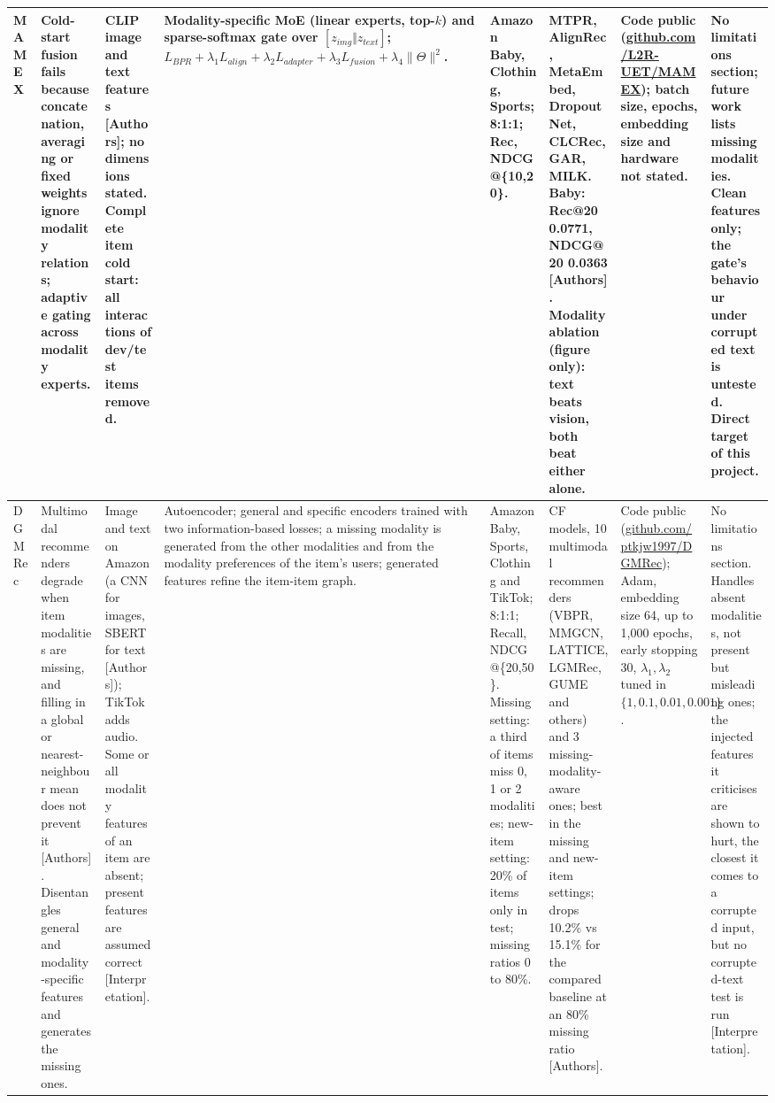 \documentclass[conference]{IEEEtran}
\begin{document}
\begin{longtable}{@{}p{1.7cm}*{7}{>{\raggedright\arraybackslash}p{2.0cm}}@{}}
\midrule
MAMEX~\cite{nguyen2025mamex} & Cold-start fusion fails because concatenation, averaging or fixed weights ignore modality relations; adaptive gating across modality experts. & CLIP image and text features [Authors]; no dimensions stated. Complete item cold start: all interactions of dev/test items removed. & Modality-specific MoE (linear experts, top-$k$) and sparse-softmax gate over $[z_{img}\Vert z_{text}]$; $L_{BPR}+\lambda_1 L_{align}+\lambda_2 L_{adapter}+\lambda_3 L_{fusion}+\lambda_4\lVert\Theta\rVert^2$. & Amazon Baby, Clothing, Sports; 8:1:1; Rec, NDCG@\{10,20\}. & MTPR, AlignRec, MetaEmbed, DropoutNet, CLCRec, GAR, MILK. Baby: Rec@20 0.0771, NDCG@20 0.0363 [Authors]. Modality ablation (figure only): text beats vision, both beat either alone. & Code public (\url{github.com/L2R-UET/MAMEX}); batch size, epochs, embedding size and hardware not stated. & No limitations section; future work lists missing modalities. Clean features only; the gate's behaviour under corrupted text is untested. Direct target of this project. \\
\midrule
DGMRec~\cite{kim2025dgmrec} & Multimodal recommenders degrade when item modalities are missing, and filling in a global or nearest-neighbour mean does not prevent it [Authors]. Disentangles general and modality-specific features and generates the missing ones. & Image and text on Amazon (a CNN for images, SBERT for text [Authors]); TikTok adds audio. Some or all modality features of an item are absent; present features are assumed correct [Interpretation]. & Autoencoder; general and specific encoders trained with two information-based losses; a missing modality is generated from the other modalities and from the modality preferences of the item's users; generated features refine the item-item graph. & Amazon Baby, Sports, Clothing and TikTok; 8:1:1; Recall, NDCG@\{20,50\}. Missing setting: a third of items miss 0, 1 or 2 modalities; new-item setting: 20\% of items only in test; missing ratios 0 to 80\%. & 5 CF models, 10 multimodal recommenders (VBPR, MMGCN, LATTICE, LGMRec, GUME and others) and 3 missing-modality-aware ones; best in the missing and new-item settings; drops 10.2\% vs 15.1\% for the compared baseline at an 80\% missing ratio [Authors]. & Code public (\url{github.com/ptkjw1997/DGMRec}); Adam, embedding size 64, up to 1,000 epochs, early stopping 30, $\lambda_1,\lambda_2$ tuned in $\{1,\allowbreak 0.1,\allowbreak 0.01,\allowbreak 0.001\}$. & No limitations section. Handles absent modalities, not present but misleading ones; the injected features it criticises are shown to hurt, the closest it comes to a corrupted input, but no corrupted-text test is run [Interpretation]. \\

\end{longtable}
\end{document}
